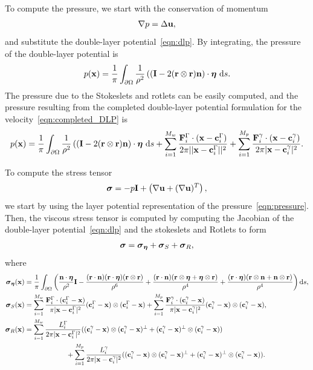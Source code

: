 \documentclass[preprint, 10pt]{elsarticle}
\begin{document}
To compute the pressure, we start with the conservation of momentum
\begin{align*}
  \nabla p = \Delta {\mathbf{u}},
\end{align*}
and substitute the double-layer potential~\eqref{eqn:dlp}.  By
integrating, the pressure of the double-layer potential is
\begin{align*}
  p({\mathbf{x}}) = \frac{1}{\pi}\int_{\partial\Omega}\frac{1}{\rho^2}\left((
    \mathbf{I} - 2({\mathbf{r}} \otimes {\mathbf{r}}){\mathbf{n}}\right)\cdot{\boldsymbol\eta}~\text{d}s. 
\end{align*}
The pressure due to the Stokeslets and rotlets can be easily computed,
and the pressure resulting from the completed double-layer potential
formulation for the velocity~\eqref{eqn:completed_DLP} is
\begin{align}
  \label{eqn:pressure} 
  p({\mathbf{x}}) = \frac{1}{\pi}\int_{\partial\Omega}\frac{1}{\rho^2}\left((
    \mathbf{I} - 2({\mathbf{r}} \otimes {\mathbf{r}}){\mathbf{n}}\right)\cdot{\boldsymbol\eta}~\text{d}s +
  \sum_{i=1}^{M_w}
  \frac{{\mathbf{F}}_i^\Gamma\cdot({\mathbf{x}}-{\mathbf{c}}_i^\Gamma)}{2\pi||{\mathbf{x}}-{\mathbf{c}}_i^{\Gamma}||^2}
  + \sum_{i=1}^{M_p}
    \frac{{\mathbf{F}}_i^\gamma\cdot({\mathbf{x}}-{\mathbf{c}}_i^\gamma)}{2\pi|{\mathbf{x}}-{\mathbf{c}}_i^\gamma|^2}.
\end{align}

To compute the stress tensor
\begin{align*} 
  {\boldsymbol\sigma} = -p \mathbf{I} + \left(\nabla {\mathbf{u}} + (\nabla{\mathbf{u}})^T\right),
\end{align*}
we start by using the layer potential representation of the
pressure~\eqref{eqn:pressure}.  Then, the viscous stress tensor is
computed by computing the Jacobian of the double-layer
potential~\eqref{eqn:dlp} and the stokeslets and Rotlets to form
\begin{align}
  \label{eqn:stress}
  {\boldsymbol\sigma} = {\boldsymbol\sigma}_{{\boldsymbol\eta}} + {\boldsymbol\sigma}_{S} + {\boldsymbol\sigma}_{R},
\end{align}
where
\begin{align*}
  {\boldsymbol\sigma}_{{\boldsymbol\eta}}({\mathbf{x}}) &= \frac{1}{\pi}\int_{\partial\Omega}\left( 
    \frac{{\mathbf{n}}\cdot{\boldsymbol\eta}}{\rho^2}\mathbf{I} 
    -\frac{({\mathbf{r}}\cdot{\mathbf{n}})({\mathbf{r}}\cdot{\boldsymbol\eta})({\mathbf{r}}\otimes{\mathbf{r}})}{\rho^6} 
    +\frac{({\mathbf{r}}\cdot{\mathbf{n}})({\mathbf{r}}\otimes{\boldsymbol\eta} + {\boldsymbol\eta}\otimes{\mathbf{r}})}{\rho^4} 
    + \frac{({\mathbf{r}}\cdot{\boldsymbol\eta})({\mathbf{r}}\otimes{\mathbf{n}} + {\mathbf{n}}\otimes{\mathbf{r}})}{\rho^4}\right)\text{d}s,\\
  {\boldsymbol\sigma}_S({\mathbf{x}}) &= \sum_{i=1}^{M_w} 
    \frac{{\mathbf{F}}_i^\Gamma\cdot({\mathbf{c}}_i^\Gamma-{\mathbf{x}})}{\pi|{\mathbf{x}}-{\mathbf{c}}_i^\Gamma|^2}
        ({\mathbf{c}}_i^\Gamma - {\mathbf{x}})\otimes({\mathbf{c}}_i^\Gamma-{\mathbf{x}})  + 
    \sum_{i=1}^{M_p}
    \frac{{\mathbf{F}}_i^\gamma\cdot({\mathbf{c}}_i^\gamma-{\mathbf{x}})}{\pi|{\mathbf{x}}-{\mathbf{c}}_i^\gamma|^2}
        ({\mathbf{c}}_i^\gamma - {\mathbf{x}})\otimes({\mathbf{c}}_i^\gamma-{\mathbf{x}}),\\
  {\boldsymbol\sigma}_R({\mathbf{x}}) &= \sum_{i=1}^{M_w} \frac{L_i^\Gamma}{2\pi|{\mathbf{x}}-{\mathbf{c}}_i^\Gamma|^2}
        (({\mathbf{c}}_i^\gamma - {\mathbf{x}})\otimes({\mathbf{c}}_i^\gamma-{\mathbf{x}})^\perp + 
    ({\mathbf{c}}_i^\gamma - {\mathbf{x}})^\perp\otimes({\mathbf{c}}_i^\gamma-{\mathbf{x}}))  \\
  &\qquad\qquad\qquad + \sum_{i=1}^{M_p} \frac{L_i^\gamma}{2\pi|{\mathbf{x}}-{\mathbf{c}}_i^\gamma|^2}
    (({\mathbf{c}}_i^\gamma - {\mathbf{x}})\otimes({\mathbf{c}}_i^\gamma-{\mathbf{x}})^\perp + 
    ({\mathbf{c}}_i^\gamma - {\mathbf{x}})^\perp\otimes({\mathbf{c}}_i^\gamma-{\mathbf{x}})).
\end{align*}
\end{document}

